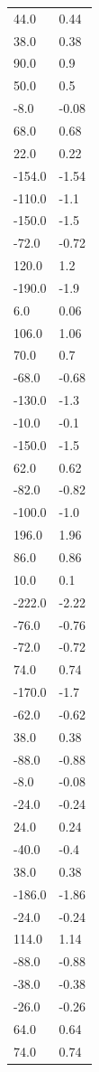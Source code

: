 \begin{longtable}{ll}
44.0 & 0.44 \\
38.0 & 0.38 \\
90.0 & 0.9 \\
50.0 & 0.5 \\
-8.0 & -0.08 \\
68.0 & 0.68 \\
22.0 & 0.22 \\
-154.0 & -1.54 \\
-110.0 & -1.1 \\
-150.0 & -1.5 \\
-72.0 & -0.72 \\
120.0 & 1.2 \\
-190.0 & -1.9 \\
6.0 & 0.06 \\
106.0 & 1.06 \\
70.0 & 0.7 \\
-68.0 & -0.68 \\
-130.0 & -1.3 \\
-10.0 & -0.1 \\
-150.0 & -1.5 \\
62.0 & 0.62 \\
-82.0 & -0.82 \\
-100.0 & -1.0 \\
196.0 & 1.96 \\
86.0 & 0.86 \\
10.0 & 0.1 \\
-222.0 & -2.22 \\
-76.0 & -0.76 \\
-72.0 & -0.72 \\
74.0 & 0.74 \\
-170.0 & -1.7 \\
-62.0 & -0.62 \\
38.0 & 0.38 \\
-88.0 & -0.88 \\
-8.0 & -0.08 \\
-24.0 & -0.24 \\
24.0 & 0.24 \\
-40.0 & -0.4 \\
38.0 & 0.38 \\
-186.0 & -1.86 \\
-24.0 & -0.24 \\
114.0 & 1.14 \\
-88.0 & -0.88 \\
-38.0 & -0.38 \\
-26.0 & -0.26 \\
64.0 & 0.64 \\
74.0 & 0.74 \\

\end{longtable}
